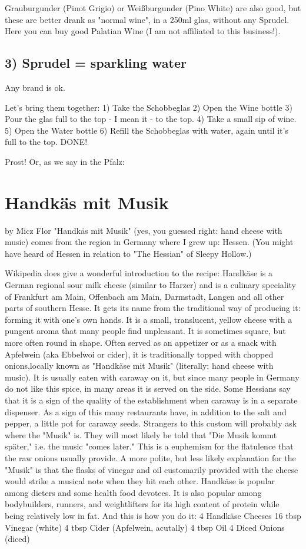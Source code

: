 Grauburgunder (Pinot Grigio) or Weißburgunder (Pino White) are also good, but these are better drank as "normal wine", in a 250ml glas, without any Sprudel. 
Here you can buy good Palatian Wine (I am not affiliated to this business!). 

\section{3) Sprudel = sparkling water}


Any brand is ok. 

Let's bring them together:
1)  Take the Schobbeglas
2) Open the Wine bottle
3) Pour the glas full to the top - I mean it - to the top. 
4) Take a small sip of wine. 
5) Open the Water bottle
6) Refill the Schobbeglas with water, again until it's full to the top.
DONE!

Prost! Or, as we say in the Pfalz:  





\chapter{Handkäs mit Musik}
by Micz Flor
"Handkäs mit Musik" (yes, you guessed right: hand cheese with music) comes from the region in Germany where I grew up: Hessen. (You might have heard of Hessen in relation to "The Hessian" of Sleepy Hollow.)


Wikipedia does give a wonderful introduction to the recipe: 
Handkäse  is a German regional sour milk cheese (similar to Harzer) and is a culinary speciality of Frankfurt am Main, Offenbach am Main, Darmstadt, Langen and all other parts of southern Hesse. It gets its name from the traditional way of producing it: forming it with one's own hands.
It is a small, translucent, yellow cheese with a pungent aroma that many people find unpleasant. It is sometimes square, but more often round in shape.
Often served as an appetizer or as a snack with Apfelwein (aka Ebbelwoi or cider), it is traditionally topped with chopped onions,locally known as "Handkäse mit Musik" (literally: hand cheese with music). It is usually eaten with caraway on it, but since many people in Germany do not like this spice, in many areas it is served on the side. Some Hessians say that it is a sign of the quality of the establishment when caraway is in a separate dispenser. As a sign of this many restaurants have, in addition to the salt and pepper, a little pot for caraway seeds.
Strangers to this custom will probably ask where the "Musik" is. They will most likely be told that "Die Musik kommt später," i.e. the music "comes later." This is a euphemism for the flatulence that the raw onions usually provide. A more polite, but less likely explanation for the "Musik" is that the flasks of vinegar and oil customarily provided with the cheese would strike a musical note when they hit each other. Handkäse is popular among dieters and some health food devotees. It is also popular among bodybuilders, runners, and weightlifters for its high content of protein while being relatively low in fat.
And this is how you do it:
4 Handkäse Cheeses
16 tbsp Vinegar (white)
4 tbsp Cider (Apfelwein, acutally)
4 tbsp Oil
4 Diced Onions (diced)

